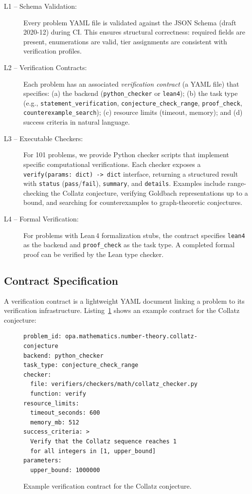 \documentclass[11pt]{article}
\begin{document}
\begin{description}  \item[L1 -- Schema Validation:] Every problem YAML file is validated against the JSON Schema (draft 2020-12) during CI. This ensures structural correctness: required fields are present, enumerations are valid, tier assignments are consistent with verification profiles.
  \item[L2 -- Verification Contracts:] Each problem has an associated \emph{verification contract} (a YAML file) that specifies: (a) the backend (\texttt{python\_checker} or \texttt{lean4}); (b) the task type (e.g., \texttt{statement\_verification}, \texttt{conjecture\_check\_range}, \texttt{proof\_check}, \texttt{counterexample\_search}); (c) resource limits (timeout, memory); and (d) success criteria in natural language.
  \item[L3 -- Executable Checkers:] For 101 problems, we provide Python checker scripts that implement specific computational verifications. Each checker exposes a \texttt{verify(params: dict) -> dict} interface, returning a structured result with \texttt{status} (\texttt{pass}/\texttt{fail}), \texttt{summary}, and \texttt{details}. Examples include range-checking the Collatz conjecture, verifying Goldbach representations up to a bound, and searching for counterexamples to graph-theoretic conjectures.
  \item[L4 -- Formal Verification:] For problems with Lean\,4 formalization stubs, the contract specifies \texttt{lean4} as the backend and \texttt{proof\_check} as the task type. A completed formal proof can be verified by the Lean type checker.
\end{description}

\subsection{Contract Specification}

A verification contract is a lightweight YAML document linking a problem to its verification infrastructure.
Listing~\ref{lst:contract} shows an example contract for the Collatz conjecture:

\begin{figure}[H]
\small
\begin{verbatim}
problem_id: opa.mathematics.number-theory.collatz-conjecture
backend: python_checker
task_type: conjecture_check_range
checker:
  file: verifiers/checkers/math/collatz_checker.py
  function: verify
resource_limits:
  timeout_seconds: 600
  memory_mb: 512
success_criteria: >
  Verify that the Collatz sequence reaches 1
  for all integers in [1, upper_bound]
parameters:
  upper_bound: 1000000
\end{verbatim}
\caption{Example verification contract for the Collatz conjecture.}
\label{lst:contract}
\end{figure}
\end{document}
